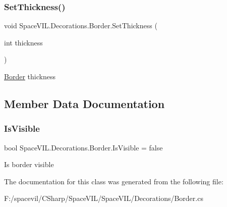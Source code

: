 \subsubsection{\texorpdfstring{Set\+Thickness()}{SetThickness()}}
{\footnotesize\ttfamily void Space\+V\+I\+L.\+Decorations.\+Border.\+Set\+Thickness (\begin{DoxyParamCaption}\item[{int}]{thickness }\end{DoxyParamCaption})\hspace{0.3cm}{\ttfamily [inline]}}



\mbox{\hyperlink{class_space_v_i_l_1_1_decorations_1_1_border}{Border}} thickness 



\subsection{Member Data Documentation}
\mbox{\label{class_space_v_i_l_1_1_decorations_1_1_border_a47746be2515f5c1e5164836c42665bac}} 
\subsubsection{\texorpdfstring{Is\+Visible}{IsVisible}}
{\footnotesize\ttfamily bool Space\+V\+I\+L.\+Decorations.\+Border.\+Is\+Visible = false}



Is border visible 



The documentation for this class was generated from the following file\+:\begin{DoxyCompactItemize}
\item 
F\+:/spacevil/\+C\+Sharp/\+Space\+V\+I\+L/\+Space\+V\+I\+L/\+Decorations/Border.\+cs\end{DoxyCompactItemize}
